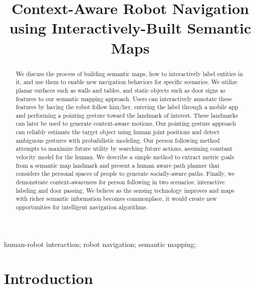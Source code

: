 \documentclass{tADR2e}
\begin{document}
   





\title{Context-Aware Robot Navigation using Interactively-Built Semantic Maps}

\author{
}

\maketitle

\begin{abstract}
We discuss the process of building semantic maps, how to interactively label entities in it, and use them to enable new navigation behaviors for specific scenarios. We utilize planar surfaces such as walls and tables, and static objects such as door signs as features to our semantic mapping approach. Users can interactively annotate these features by having the robot follow him/her, entering the label through a mobile app and performing a pointing gesture toward the landmark of interest. These landmarks can later be used to generate context-aware motions. Our pointing gesture approach can reliably estimate the target object using human joint positions and detect ambiguous gestures with probabilistic modeling. Our person following method attempts to maximize future utility by searching future actions, assuming constant velocity model for the human. We describe a simple method to extract metric goals from a semantic map landmark and present a human aware path planner that considers the personal spaces of people to generate socially-aware paths. Finally, we demonstrate context-awareness for person following in two scenarios: interactive labeling and door passing. We believe as the sensing technology improves and maps with richer semantic information becomes commonplace, it would create new opportunities for intelligent navigation algorithms.
\end{abstract}

\begin{keywords}
human-robot interaction; robot navigation; semantic mapping; 
\end{keywords}


\section{Introduction}
\end{document}
